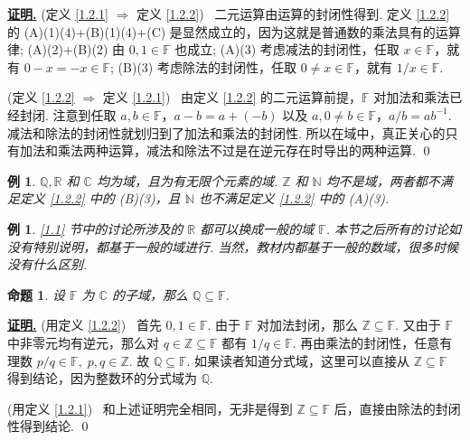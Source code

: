 \documentclass[10pt,openany]{article}
\theoremstyle{thmstyle} %
\theoremstyle{defstyle} %
\theoremstyle{prostyle} %
\newtheorem{proposition}[theorem]{命题}
\theoremstyle{exastyle}
\newtheorem{example}[theorem]{例}
\theoremstyle{remstyle}
\renewenvironment{proof}[1][证明]{\par\underline{\textbf{#1.}} \;\fangsong}{\qed\par}
\newcommand{\F}{\mathbb{F}}
\begin{document}
\begin{proof}
	(定义 \ref{1.2.1}  \( \Rightarrow \) 定义 \ref{1.2.2}) \ 二元运算由运算的封闭性得到. 定义 \ref{1.2.2} 的 (A)(1)(4)+(B)(1)(4)+(C) 是显然成立的，因为这就是普通数的乘法具有的运算律; (A)(2)+(B)(2) 由 \( 0,1 \in \F \) 也成立; (A)(3) 考虑减法的封闭性，任取 \( x \in \F \)，就有 \( 0-x=-x \in \F \); (B)(3) 考虑除法的封闭性，任取 \( 0 \neq x \in \F \)，就有 \( 1/x \in \F \).
	
	\vspace{1ex}
	
	(定义 \ref{1.2.2}  \( \Rightarrow \) 定义 \ref{1.2.1}) \ 由定义 \ref{1.2.2} 的二元运算前提，\( \F \) 对加法和乘法已经封闭. 注意到任取 \( a,b \in \F \)，\( a-b=a+(-b) \) 以及 \( a, 0 \neq b \in \F \)，\( a/b=ab^{-1} \). 减法和除法的封闭性就划归到了加法和乘法的封闭性. 所以在域中，真正关心的只有加法和乘法两种运算，减法和除法不过是在逆元存在时导出的两种运算.
\end{proof}

\begin{example}
	\( \mathbb{Q}, \mathbb{R} \) 和 \( \mathbb{C} \) 均为域，且为有无限个元素的域. \( \mathbb{Z} \) 和 \( \mathbb{N} \) 均不是域，两者都不满足定义 \ref{1.2.2} 中的 (B)(3)，且 \( \mathbb{N} \) 也不满足定义 \ref{1.2.2} 中的 (A)(3).
\end{example}

\begin{example}
	\ref{1.1} 节中的讨论所涉及的 \( \mathbb{R} \) 都可以换成一般的域 \( \F \). 本节之后所有的讨论如没有特别说明，都基于一般的域进行. 当然，教材内都基于一般的数域，很多时候没有什么区别.
\end{example}

\begin{proposition}\label{1.2.6}
	设 \( \F \) 为 \( \mathbb{C} \) 的子域，那么 \( \mathbb{Q} \subseteq \F \).
	
\end{proposition}

\begin{proof}
	(用定义 \ref{1.2.2}) \ 首先 \( 0,1 \in \F \). 由于 \( \F \) 对加法封闭，那么 \( \mathbb{Z} \subseteq \F \). 又由于 \( \F \) 中非零元均有逆元，那么对 \( q \in \mathbb{Z} \subseteq \F \) 都有 \( 1/q \in \F \). 再由乘法的封闭性，任意有理数 \( p/q \in \F, \; p,q \in \mathbb{Z} \). 故 \( \mathbb{Q} \subseteq \F \). 如果读者知道分式域，这里可以直接从 \( \mathbb{Z} \subseteq \F \) 得到结论，因为整数环的分式域为 \( \mathbb{Q} \).
	
	\vspace{1ex}
	
	(用定义 \ref{1.2.1}) \ 和上述证明完全相同，无非是得到 \( \mathbb{Z} \subseteq \F \) 后，直接由除法的封闭性得到结论.
\end{proof}
\end{document}

